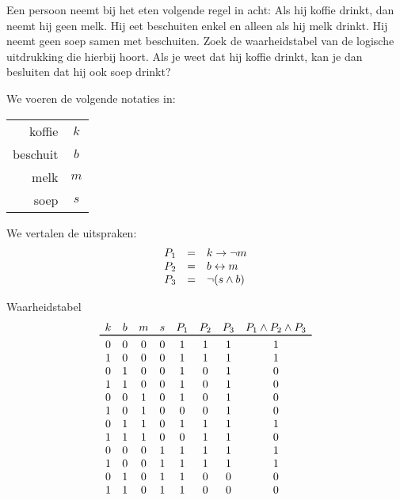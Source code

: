 \begin{oef}
Een persoon neemt bij het eten volgende regel in acht:
Als hij koffie drinkt, dan neemt hij geen melk.
Hij eet beschuiten enkel en alleen als hij melk drinkt.
Hij neemt geen soep samen met beschuiten.
Zoek de waarheidstabel van de logische uitdrukking die hierbij hoort. 
Als je weet dat hij koffie drinkt, kan je dan besluiten dat hij ook soep drinkt?
\begin{opl}
\begin{samepage}
We voeren de volgende notaties in:
\begin{center}
  \begin{tabular}{rc}
    koffie   & $k$ \\
    beschuit & $b$ \\
    melk     & $m$ \\
    soep     & $s$
  \end{tabular}
\end{center}
\end{samepage}
\begin{samepage}
We vertalen de uitspraken:
\[
  \begin{array}{rcl}
    P_1 & = & k \rightarrow \neg m \\
    P_2 & = & b \leftrightarrow m \\
    P_3 & = & \neg (s \wedge b)
  \end{array}
\]
\end{samepage}
\begin{samepage}
Waarheidstabel
\[
  \begin{array}{cccccccc}
    k & b & m & s & P_1 & P_2 & P_3 & P_1 \en P_2 \en P_3 \\
    \toprule
    0 & 0 & 0 & 0 & 1 & 1 & 1 & 1 \\
    1 & 0 & 0 & 0 & 1 & 1 & 1 & 1 \\
    0 & 1 & 0 & 0 & 1 & 0 & 1 & 0 \\
    1 & 1 & 0 & 0 & 1 & 0 & 1 & 0 \\
    0 & 0 & 1 & 0 & 1 & 0 & 1 & 0 \\
    1 & 0 & 1 & 0 & 0 & 0 & 1 & 0 \\
    0 & 1 & 1 & 0 & 1 & 1 & 1 & 1 \\
    1 & 1 & 1 & 0 & 0 & 1 & 1 & 0 \\
    0 & 0 & 0 & 1 & 1 & 1 & 1 & 1 \\
    1 & 0 & 0 & 1 & 1 & 1 & 1 & 1 \\
    0 & 1 & 0 & 1 & 1 & 0 & 0 & 0 \\
    1 & 1 & 0 & 1 & 1 & 0 & 0 & 0 \\

\end{array}\]
\end{samepage}
\end{opl}
\end{oef}
